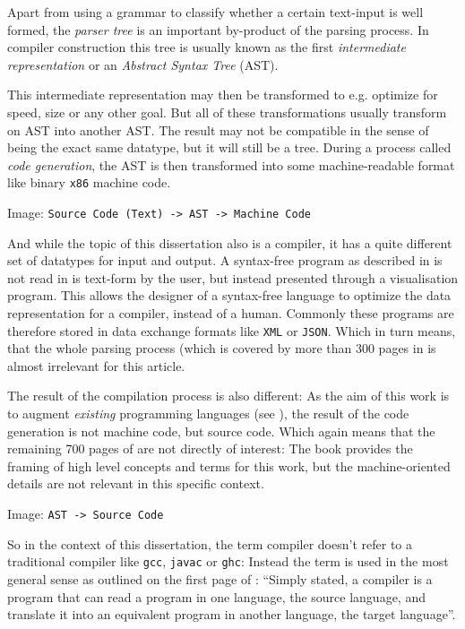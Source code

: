 Apart from using a grammar to classify whether a certain text-input is well formed, the \textit{parser tree} is an important by-product of the parsing process. In compiler construction this tree is usually known as the first \textit{intermediate representation} or an \textit{Abstract Syntax Tree} (AST)\cite[Chapter 6]{dragon_book}.

This intermediate representation may then be transformed to e.g. optimize for speed, size or any other goal. But all of these transformations usually transform on AST into another AST. The result may not be compatible in the sense of being the exact same datatype, but it will still be a tree. During a process called \textit{code generation}, the AST is then transformed into some machine-readable format like binary \texttt{x86} machine code\cite[Chapter 8]{dragon_book}.

Image: \texttt{Source Code (Text) -> AST -> Machine Code}

And while the topic of this dissertation also is a compiler, it has a quite different set of datatypes for input and output. A syntax-free program as described in  is not read in is text-form by the user, but instead presented through a visualisation program. This allows the designer of a syntax-free language to optimize the data representation for a compiler, instead of a human. Commonly these programs are therefore stored in data exchange formats like \texttt{XML} or \texttt{JSON}. Which in turn means, that the whole parsing process (which is covered by more than 300 pages in \cite{dragon_book} is almost irrelevant for this article.

The result of the compilation process is also different: As the aim of this work is to augment \textit{existing} programming languages (see ), the result of the code generation is not machine code, but source code. Which again means that the remaining 700 pages of \cite{dragon_book} are not directly of interest: The book provides the framing of high level concepts and terms for this work, but the machine-oriented details are not relevant in this specific context.

Image: \texttt{AST -> Source Code}

So in the context of this dissertation, the term compiler doesn't refer to a traditional compiler like \texttt{gcc}, \texttt{javac} or \texttt{ghc}: Instead the term is used in the most general sense as outlined on the first page of \cite{dragon_book}: \enquote{Simply stated, a compiler is a program that can read a program in one language, the source language, and translate it into an equivalent program in another language, the target language}.

